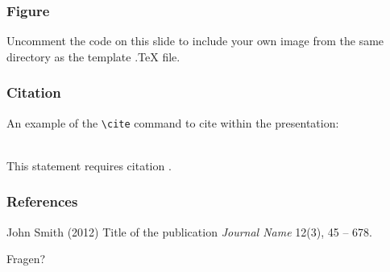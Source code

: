 \documentclass{beamer}
\begin{document}

\begin{frame}
\frametitle{Figure}
Uncomment the code on this slide to include your own image from the same directory as the template .TeX file.
\end{frame}


\begin{frame}[fragile] %
\frametitle{Citation}
An example of the \verb|\cite| command to cite within the presentation:\\~

This statement requires citation \cite{p1}.
\end{frame}


\begin{frame}
\frametitle{References}
\footnotesize{
\begin{thebibliography}{99} %
 John Smith (2012)
\newblock Title of the publication
\newblock \emph{Journal Name} 12(3), 45 -- 678.
\end{thebibliography}
}
\end{frame}


\begin{frame}
\Huge{\centerline{Fragen?}}
\end{frame}

\end{document}

